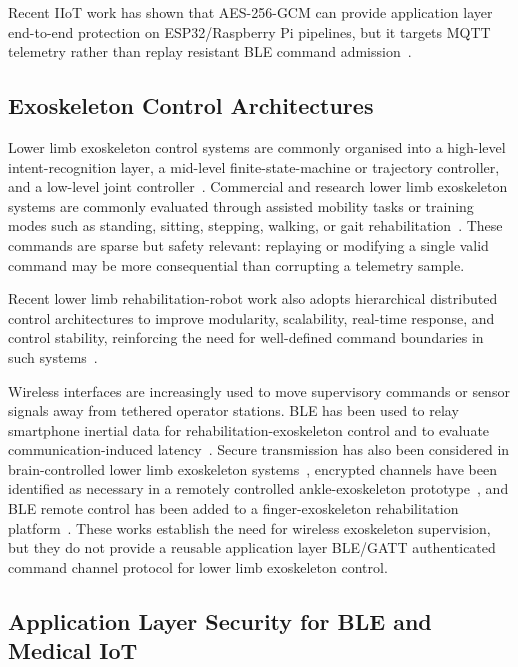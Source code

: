 \documentclass[journal]{IEEEtran}
\begin{document}
Recent IIoT work has shown that AES-256-GCM can provide application layer end-to-end protection on ESP32/Raspberry Pi pipelines, but it targets MQTT telemetry rather than replay resistant BLE command admission~\cite{amirkhanova2026iiot}.


\subsection{Exoskeleton Control Architectures}

Lower limb exoskeleton control systems are commonly organised into a high-level intent-recognition layer, a mid-level finite-state-machine or trajectory controller, and a low-level joint controller~\cite{tucker2015review,baud2021review}.
Commercial and research lower limb exoskeleton systems are commonly evaluated through assisted mobility tasks or training modes such as standing, sitting, stepping, walking, or gait rehabilitation~\cite{vandijsseldonk2021predictors,lee2021locomat,atlas2030_2022}.
These commands are sparse but safety relevant: replaying or modifying a single valid command may be more consequential than corrupting a telemetry sample.

Recent lower limb rehabilitation-robot work also adopts hierarchical distributed control architectures to improve modularity, scalability, real-time response, and control stability, reinforcing the need for well-defined command boundaries in such systems~\cite{wang2025distributed}.

Wireless interfaces are increasingly used to move supervisory commands or sensor signals away from tethered operator stations.
BLE has been used to relay smartphone inertial data for rehabilitation-exoskeleton control and to evaluate communication-induced latency~\cite{andersson2024wireless}.
Secure transmission has also been considered in brain-controlled lower limb exoskeleton systems~\cite{vinoj2019bclle}, encrypted channels have been identified as necessary in a remotely controlled ankle-exoskeleton prototype~\cite{ozhiken2025ankle}, and BLE remote control has been added to a finger-exoskeleton rehabilitation platform~\cite{wilhelm2022finger}.
These works establish the need for wireless exoskeleton supervision, but they do not provide a reusable application layer BLE/GATT authenticated command channel protocol for lower limb exoskeleton control.

\subsection{Application Layer Security for BLE and Medical IoT}
\end{document}
